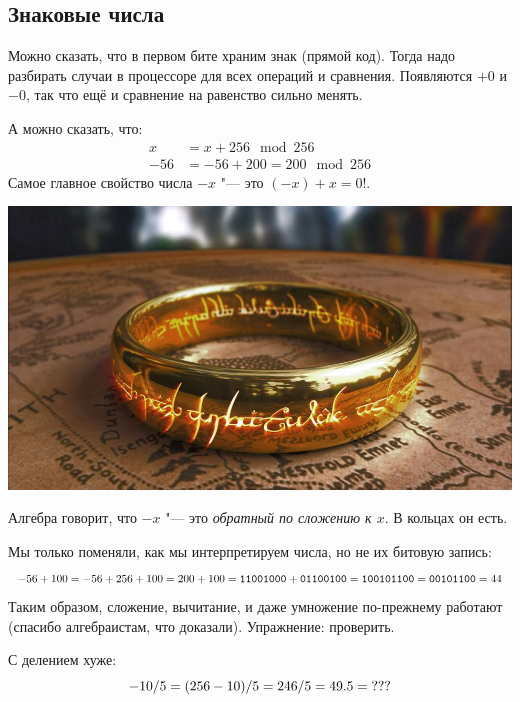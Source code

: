 \subsection{Знаковые числа}

\begin{frame}
\end{frame}

\begin{frame}
	Можно сказать, что в первом бите храним знак (прямой код).
	Тогда надо разбирать случаи в процессоре для всех операций и сравнения.
	Появляются $+0$ и $-0$, так что ещё и сравнение на равенство сильно менять.

	А можно сказать, что:
	\begin{align*}
		x &= x + 256 \mod 256 \\
		-56 &= -56 + 200 = 200 \mod 256
	\end{align*}
	Самое главное свойство числа $-x$ "--- это $(-x)+x=0$!.
\end{frame}

\begin{frame}
	\begin{center}
		\includegraphics[scale=0.3]{one-ring-to-rule.jpg}
	\end{center}
\end{frame}

\begin{frame}
	Алгебра говорит, что $-x$ "--- это \textit{обратный по сложению к $x$}.
	В кольцах он есть.

	Мы только поменяли, как мы интерпретируем числа, но не их битовую запись:
	\[
		-56 + 100 = -56 + 256 + 100 = 200 + 100 = \t{1100 1000} + \t{0110 0100} = \t{1 0010 1100} = \t{0010 1100} = 44
	\]
	Таким образом, сложение, вычитание, и даже умножение по-прежнему работают (спасибо алгебраистам, что доказали).
	Упражнение: проверить.

	С делением хуже:
	\[
		-10 / 5 = (256 - 10) / 5 = 246 / 5 = 49.5 = \t{???}
	\]
\end{frame}

